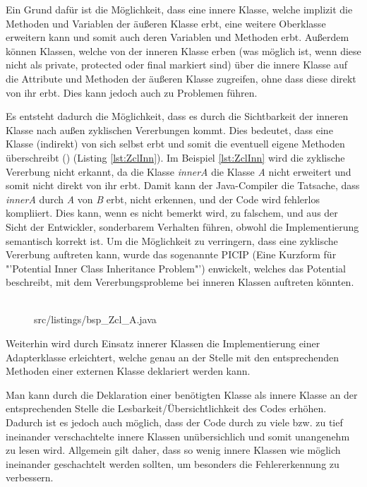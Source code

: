Ein Grund dafür ist die Möglichkeit, dass eine innere Klasse, welche implizit die Methoden und Variablen der äußeren Klasse erbt, eine weitere Oberklasse erweitern kann und somit auch deren Variablen und Methoden erbt.
Außerdem können Klassen, welche von der inneren Klasse erben (was möglich ist, wenn diese nicht als private, protected oder final markiert sind) über die innere Klasse auf die Attribute und Methoden der äußeren Klasse zugreifen, ohne dass diese direkt von ihr erbt. Dies kann jedoch auch zu Problemen führen.

Es entsteht dadurch die Möglichkeit, dass es durch die Sichtbarkeit der inneren Klasse nach außen zyklischen Vererbungen kommt. Dies bedeutet, dass eine Klasse (indirekt) von sich selbst erbt und somit die eventuell eigene Methoden überschreibt (\cite{DBLP:journals/corr/abs-1301-6260}) (Listing \ref{lst:ZclInn}).
Im Beispiel \ref{lst:ZclInn}  wird die zyklische Vererbung nicht erkannt, da die Klasse {\it innerA} die Klasse {\it A} nicht erweitert und somit nicht direkt von ihr erbt. Damit kann der Java-Compiler die Tatsache, dass {\it innerA} durch {\it A} von {\it B} erbt, nicht erkennen, und der Code wird fehlerlos kompliiert.
Dies kann, wenn es nicht bemerkt wird, zu falschem, und aus der Sicht der Entwickler, sonderbarem Verhalten führen, obwohl die Implementierung semantisch korrekt ist.
Um die Möglichkeit zu verringern, dass eine zyklische Vererbung auftreten kann, wurde das sogenannte PICIP (Eine Kurzform für "'Potential Inner Class Inheritance Problem"') enwickelt, welches das Potential beschreibt, mit dem Vererbungsprobleme bei inneren Klassen auftreten könnten.
\\
\\
\begin{figure}[hbt]
\lstset{language=Java}
 {src/listings/bsp_Zcl_A.java}
\end{figure}

Weiterhin wird durch Einsatz innerer Klassen die Implementierung einer Adapterklasse erleichtert, welche genau an der Stelle mit den entsprechenden Methoden einer externen Klasse deklariert werden kann.

Man kann durch die Deklaration einer benötigten Klasse als innere Klasse an der entsprechenden Stelle die Lesbarkeit/Übersichtlichkeit des Codes erhöhen.
Dadurch ist es jedoch auch möglich, dass der Code durch zu viele bzw. zu tief ineinander verschachtelte innere Klassen unübersichlich und somit unangenehm zu lesen wird.
Allgemein gilt daher, dass so wenig innere Klassen wie möglich ineinander geschachtelt werden sollten, um besonders die Fehlererkennung zu verbessern.


